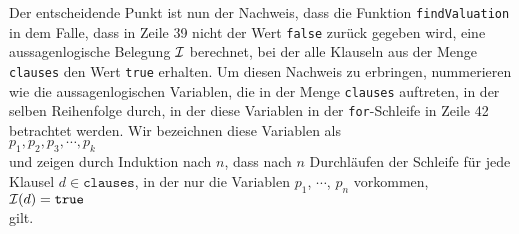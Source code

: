 Der entscheidende Punkt ist nun der Nachweis, dass die Funktion \texttt{findValuation} in dem Falle,
dass in Zeile 39 nicht der Wert \texttt{false} zur\"{u}ck gegeben wird, eine aussagenlogische Belegung $\mathcal{I}$ berechnet, bei der
alle Klauseln aus der Menge \texttt{clauses} den Wert \texttt{true} erhalten.  Um diesen Nachweis zu
erbringen, nummerieren wie die aussagenlogischen Variablen, die in der Menge \texttt{clauses}
auftreten, in der selben Reihenfolge durch, in der diese Variablen in der \texttt{for}-Schleife in Zeile
42 betrachtet werden.  Wir bezeichnen diese Variablen als
\\[0.2cm]
\hspace*{1.3cm}
 $p_1, p_2, p_3, \cdots, p_k$
\\[0.2cm]
und zeigen durch Induktion nach $n$, dass nach $n$ Durchl\"{a}ufen der Schleife f\"{u}r jede Klausel $d \in \texttt{clauses}$, in der nur
die Variablen $p_1$, $\cdots$, $p_n$ vorkommen, 
\\[0.2cm]
\hspace*{1.3cm}
$\mathcal{I}(d) = \texttt{true}$
\\[0.2cm]
gilt.
